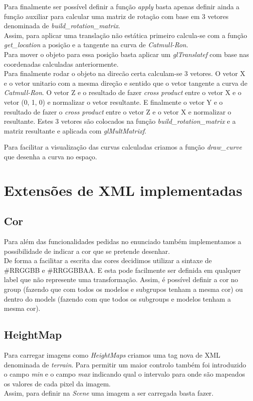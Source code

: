\documentclass[a4paper]{report}
\begin{document}

Para finalmente ser possível definir a função \textit{apply} basta apenas
definir ainda a função auxiliar para calcular uma matriz de rotação com base em
3 vetores denominada de \textit{build\_rotation\_matrix}.\\
Assim, para aplicar uma translação não estática primeiro calcula-se com a função
\textit{get\_location} a posição e a tangente na curva de
\textit{Catmull-Ron}.\\
Para mover o objeto para essa posição basta aplicar um \textit{glTranslatef}
com base nas coordenadas calculadas anteriormente.\\
Para finalmente rodar o objeto na direcão certa calculam-se 3 vetores. O vetor X
e o vetor unitario com a mesma direção e sentido que o vetor tangente a curva de
\textit{Catmull-Ron}. O vetor Z e o resultado de fazer \textit{cross product}
entre o vetor X e o vetor (0, 1, 0) e normalizar o vetor resultante. E
finalmente o vetor Y e o resultado de fazer o \textit{cross product} entre o
vetor Z e o vetor X e normalizar o resultante. Estes 3 vetores são colocados na
função \textit{build\_rotation\_matrix} e a matriz resultante e aplicada com
\textit{glMultMatrixf}.


Para facilitar a visualização das curvas calculadas criamos a função
\textit{draw\_curve} que desenha a curva no espaço.\\

\section{Extensões de XML implementadas}

\subsection{Cor}
Para além das funcionalidades pedidas no enunciado também implementamos a
possibilidade de indicar a cor que se pretende desenhar.\\
De forma a facilitar a escrita das cores decidimos utilizar a sintaxe de
\#RRGGBB e \#RRGGBBAA. E esta pode facilmente ser definida em qualquer label que
não represente uma transformação. Assim, é possível definir a cor no group
(fazendo que com todos os modelos e subgrupos tenham a mesma cor) ou dentro do
models (fazendo com que todos os subgroups e modelos tenham a mesma cor).\\

\subsection{HeightMap}
Para carregar imagens como \textit{HeightMaps} criamos uma tag nova de XML
denominada de \textit{terrain}. Para permitir um maior controlo também foi
introduzido o campo \textit{min} e o campo \textit{max} indicando qual o
intervalo para onde são mapeados os valores de cada pixel da imagem.\\
Assim, para definir na \textit{Scene} uma imagem
a ser carregada basta fazer.
\end{document}
